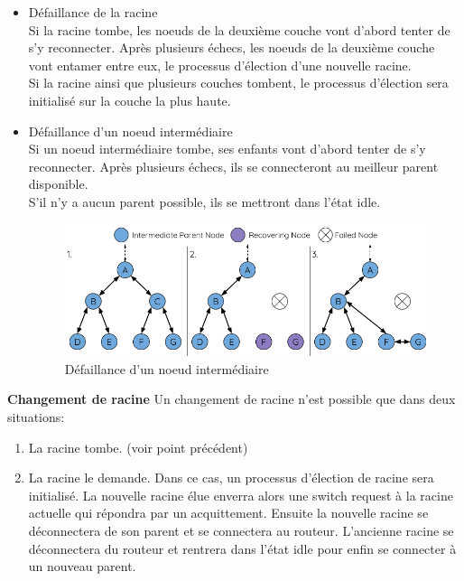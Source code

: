 \documentclass[a4paper, 12pt]{report}
\begin{document}
            \begin{itemize}
                \item Défaillance de la racine\\
                    Si la racine tombe, les noeuds de la deuxième couche vont d'abord tenter de s'y reconnecter.
                    Après plusieurs échecs, les noeuds de la deuxième couche vont entamer entre eux, le processus d'élection d'une nouvelle racine.\\
                    Si la racine ainsi que plusieurs couches tombent, le processus d'élection sera initialisé sur la couche la plus haute.


                \item Défaillance d'un noeud intermédiaire\\
                    Si un noeud intermédiaire tombe, ses enfants vont d'abord tenter de s'y reconnecter.
                    Après plusieurs échecs, ils se connecteront au meilleur parent disponible.\\
                    S'il n'y a aucun parent possible, ils se mettront dans l'état idle.
                    \begin{figure}[H]
                        \centering
                        \includegraphics[scale=0.5]{images/mesh-parent-node-failure.png}
                        \caption{Défaillance d'un noeud intermédiaire\cite{esp-mesh_w}}
                    \end{figure}
            \end{itemize}
            \vspace{0.5cm}
            \textbf{Changement de racine}\newline
                Un changement de racine n'est possible que dans deux situations:
                \begin{enumerate}
                    \item La racine tombe. (voir point précédent)
                    \item La racine le demande.
                        Dans ce cas, un processus d'élection de racine sera initialisé. La nouvelle racine élue
                        enverra alors une switch request à la racine actuelle qui répondra par un acquittement.
                        Ensuite la nouvelle racine se déconnectera de son parent et se connectera au routeur.
                        L'ancienne racine se déconnectera du routeur et rentrera dans l'état idle pour enfin se connecter à un nouveau parent.
                \end{enumerate}
\end{document}
